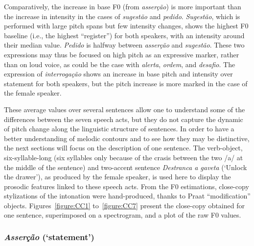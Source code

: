 \documentclass[output=paper]{LSP/langsci}
\begin{document}
Comparatively, the increase in base F0 (from \textit{asserção}) is more important than the increase in intensity in the cases of \textit{sugestão} and \textit{pedido}. 
\textit{Sugestão}, which is performed with large pitch spans but few intensity changes, shows the highest F0 baseline (i.e., the highest ``register'') for both speakers, with an intensity around their median value. 
\textit{Pedido} is halfway between \textit{asserção} and \textit{sugestão}. 
These two expressions may thus be focused on high pitch as an expressive marker, rather than on loud voice, as could be the case with \textit{alerta}, \textit{ordem}, and \textit{desafio}. 
The expression of \textit{interrogação} shows an increase in base pitch and intensity over statement for both speakers, but the pitch increase is more marked in the case of the female speaker.

These average values over several sentences allow one to understand some of the differences between the seven speech acts, but they do not capture the dynamic of pitch change along the linguistic structure of sentences. 
In order to have a better understanding of melodic contours and to see how they may be distinctive, the next sections will focus on the description of one sentence. 
The verb-object, six-syllable-long (six syllables only because of the crasis between the two /a/ at the middle of the sentence) and two-accent sentence \textit{Destranca a gaveta} (`Unlock the drawer'), as produced by the female speaker, is used here to display the prosodic features linked to these speech acts. 
From the F0 estimations, close-copy stylizations of the intonation \citep{hart1991jasa} were hand-produced, thanks to Praat ``modification'' objects. 
Figures~\ref{figure:CC1} to~\ref{figure:CC7} present the close-copy obtained for one sentence, superimposed on a spectrogram, and a plot of the raw F0 values.


\subsubsection{\textit{Asserção} (`statement')}
\end{document}

